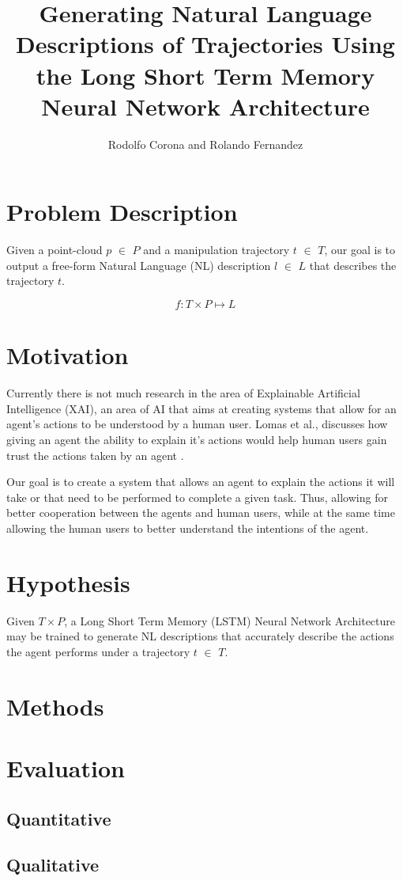 \documentclass[letterpaper, 12 pt, conference]{ieeeconf}
\title{\LARGE \bf
Generating Natural Language Descriptions of Trajectories Using the Long Short Term Memory Neural Network Architecture}
\author{Rodolfo Corona and Rolando Fernandez}
\begin{document}
\maketitle
\thispagestyle{empty}
\pagestyle{empty}


\section{Problem Description}

Given a point-cloud $p$ $\in$ $P$ and a manipulation trajectory $t$ $\in$ $T$, our goal is to output a free-form  Natural Language (NL) description $l$ $\in$ $L$ that describes the trajectory $t$.

\begin{equation}
f: T\times P \mapsto L
\end{equation}

\section{Motivation}

Currently there is not much research in the area of Explainable Artificial Intelligence (XAI), an area of AI that aims at creating systems that allow for an agent's actions to be understood by a human user. Lomas et al., discusses how giving an agent the ability to explain it's actions would help human users gain trust the actions taken by an agent \cite{lomas2012explaining}.

Our goal is to create a system that allows an agent to explain the actions it will take or that need to be performed to complete a given task. Thus, allowing for better cooperation between the agents and human users, while at the same time allowing the human users to better understand the intentions of the agent.

\section{Hypothesis}

Given $T\times P$, a Long Short Term Memory (LSTM) Neural Network Architecture may be trained to generate NL descriptions that accurately describe the actions the agent performs under a trajectory $t$ $\in$ $T$.

\section{Methods}

\section{Evaluation}

\subsection{Quantitative}

\subsection{Qualitative}



\end{document}
